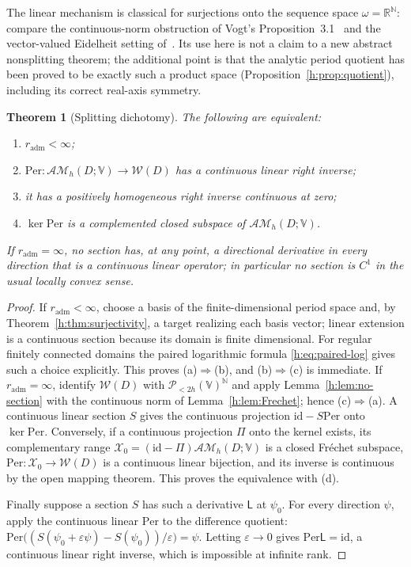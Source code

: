 \documentclass[11pt,a4paper]{article}
\numberwithin{equation}{section}
\newtheorem{theorem}{Theorem}[section]
\theoremstyle{definition}
\theoremstyle{remark}
\theoremstyle{plain}
\newcommand{\RR}{\mathbb R}
\newcommand{\AM}{\mathcal{AM}}
\newcommand{\Per}{\mathrm{Per}}
\newcommand{\VV}{\mathbb V}                       %
\newcommand{\PolH}{\mathscr P_{<2h}(\VV)}
\begin{document}
The linear mechanism is classical for surjections onto the sequence space
$\omega=\RR^{\mathbb N}$: compare the continuous-norm obstruction of Vogt's
Proposition~3.1~\cite{Vogt} and the vector-valued Eidelheit setting
of~\cite{DV}. Its use here is not a claim to a new abstract nonsplitting
theorem; the additional point is that the analytic period quotient has been
proved to be exactly such a product space
(Proposition~\ref{h:prop:quotient}), including its correct real-axis symmetry.

\begin{theorem}[Splitting dichotomy]\label{h:thm:split}
The following are equivalent:
\begin{enumerate}[label=\textup{(\alph*)}]
\item $r_{\mathrm{adm}}<\infty$;
\item $\Per:\AM_h(D;\VV)\to\mathscr W(D)$ has a continuous linear right
inverse;
\item it has a positively homogeneous right inverse continuous at zero;
\item $\ker\Per$ is a complemented closed subspace of $\AM_h(D;\VV)$.
\end{enumerate}
If $r_{\mathrm{adm}}=\infty$, no section has, at any point, a directional
derivative in every direction that is a continuous linear operator; in
particular no section is $C^1$ in the usual locally convex sense.
\end{theorem}

\begin{proof}
If $r_{\mathrm{adm}}<\infty$, choose a basis of the finite-dimensional period
space and, by Theorem~\ref{h:thm:surjectivity}, a target realizing each basis
vector; linear extension is a continuous section because its domain is finite
dimensional. For regular finitely connected domains the paired logarithmic
formula \eqref{h:eq:paired-log} gives such a choice explicitly. This proves
(a)$\Rightarrow$(b), and (b)$\Rightarrow$(c) is immediate. If
$r_{\mathrm{adm}}=\infty$, identify $\mathscr W(D)$ with $\PolH^{\mathbb N}$ and
apply Lemma~\ref{h:lem:no-section} with the continuous norm of
Lemma~\ref{h:lem:Frechet}; hence (c)$\Rightarrow$(a). A continuous linear
section $S$ gives the continuous projection $\mathrm{id}-S\Per$ onto $\ker\Per$.
Conversely, if a continuous projection $\Pi$ onto the kernel exists, its
complementary range $\mathcal X_0=(\mathrm{id}-\Pi)\AM_h(D;\VV)$ is a closed
Fr\'echet subspace, $\Per:\mathcal X_0\to\mathscr W(D)$ is a continuous linear
bijection, and its inverse is continuous by the open mapping theorem. This
proves the equivalence with (d).

Finally suppose a section $S$ has such a derivative $\mathsf L$ at $\psi_0$.
For every direction $\psi$, apply the continuous linear $\Per$ to the
difference quotient:
$\Per\bigl((S(\psi_0+\varepsilon\psi)-S(\psi_0))/\varepsilon\bigr)=\psi$.
Letting $\varepsilon\to0$ gives $\Per\mathsf L=\mathrm{id}$, a continuous linear
right inverse, which is impossible at infinite rank.
\end{proof}
\end{document}
